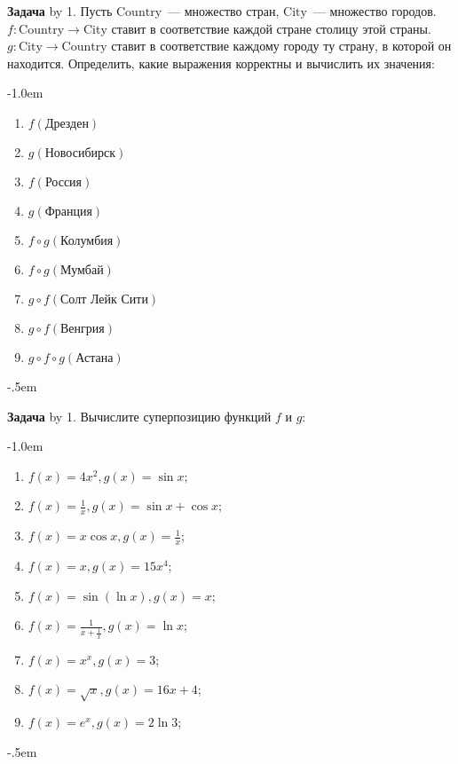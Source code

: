 \documentclass[a4paper,10pt]{article}
\def\problem{\textbf{Задача \the\problemnum}\advance\problemnum by 1}
\begin{document}
{\problem. Пусть $\mathrm{Country}$~--- множество стран, $\mathrm{City}$~--- множество городов. $f:\mathrm{Country}\to\mathrm{City}$ ставит в соответствие каждой стране столицу этой страны. $g:\mathrm{City}\to\mathrm{Country}$ ставит в соответствие каждому городу ту страну, в которой он находится. Определить, какие выражения корректны и вычислить их значения: \par\kern-1.0em
\begin{multicols}{3}
	\begin{enumerate}[label=(\arabic*)\,]
		\item $f(\text{Дрезден})$
		\item $g(\text{Новосибирск})$
		\item $f(\text{Россия})$
		\item $g(\text{Франция})$
		\item $f\circ g(\text{Колумбия})$
		\item $f\circ g(\text{Мумбай})$
		\item $g\circ f(\text{Солт Лейк Сити})$
		\item $g\circ f(\text{Венгрия})$
		\item $g\circ f\circ g(\text{Астана})$
	\end{enumerate}
\end{multicols}
\par\kern-.5em

\problem. Вычислите суперпозицию функций $f$ и $g$: \par\kern-1.0em
\begin{multicols}{3}
	\begin{enumerate}[label=(\arabic*)\,]
		\item $f(x)=4x^2, g(x) =\sin x$;
		\item $f(x)=\frac1x, g(x) = \sin x+\cos x$;
		\item $f(x)=x\cos x, g(x) = \frac 1x$;
		\item $f(x)=x, g(x) = 15x^4$;
		\item $f(x)=\sin(\ln x), g(x) = x$;
		\item $f(x)=\frac{1}{x+\frac1x}, g(x) = \ln x$;
		\item $f(x) = x^x, g(x) = 3$;
		\item $f(x) = \sqrt{x}, g(x) = 16x+4$;
		\item $f(x) = e^x, g(x) = 2\ln 3$;
	\end{enumerate}
\end{multicols}
\par\kern-.5em

}
\end{document}
